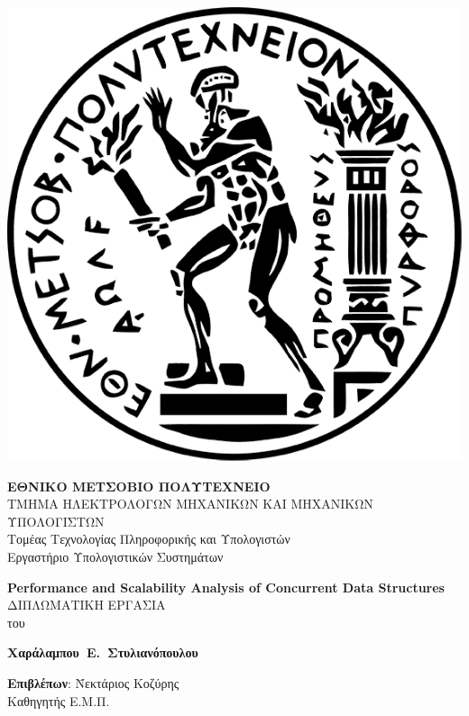 \documentclass[12pt, twoside, a4paper]{report}
\begin{document}
\maketitle
\clearpage\null\newpage
\hspace{10pt}
\includegraphics[scale=0.1]{pyrforos.png}  %
\noindent
\parbox[b]{0.6\textwidth} {
\raggedright \textbf{\normalsize{Ε}\small{ΘΝΙΚΟ} 
\normalsize{Μ}\small{ΕΤΣΟΒΙΟ}
\normalsize{Π}\small{ΟΛΥΤΕΧΝΕΙΟ}} \\
\small
ΤΜΗΜΑ ΗΛΕΚΤΡΟΛΟΓΩΝ ΜΗΧΑΝΙΚΩΝ ΚΑΙ ΜΗΧΑΝΙΚΩΝ ΥΠΟΛΟΓΙΣΤΩΝ \\
Τομέας Τεχνολογίας Πληροφορικής και Υπολογιστών \\
Εργαστήριο Υπολογιστικών Συστημάτων}

\begin{center}
\vspace{8ex}
\large \textbf{\textlatin{Performance and Scalability Analysis of Concurrent Data Structures}} \\
\vspace{10ex}
\large
ΔΙΠΛΩΜΑΤΙΚΗ ΕΡΓΑΣΙΑ \\
\vspace{2ex}
\normalsize
του \\
\vspace{2ex}
\parbox[c]{0.4\textwidth} { \center\textbf{
\mbox{Χαράλαμπου Ε. Στυλιανόπουλου} }}
\vspace{10ex}
\flushleft
\begin{tabbing}
\textbf{Επιβλέπων}: \= Νεκτάριος Κοζύρης \\
		    \> Καθηγητής Ε.Μ.Π. \\
\end{tabbing}
\end{center}
\end{document}
